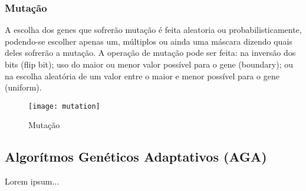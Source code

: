     \subsubsection{Mutação}
    
    A escolha dos genes que sofrerão mutação é feita aleatoria ou probabilisticamente, podendo-se
    escolher apenas um, múltiplos ou ainda uma máscara dizendo quais deles sofrerão a mutação. 
    A operação de mutação pode ser feita: na inversão dos bits (flip bit); uso do maior ou menor 
    valor possível para o gene (boundary); ou na escolha aleatória de um valor entre o maior 
    e menor possível para o gene (uniform).
    
    \begin{figure}[!ht]
      \centering
      \texttt{[image: mutation]}
      \caption{Mutação}
    \end{figure}
    
\subsection{Algorítmos Genéticos Adaptativos (AGA)}
Lorem ipsum...